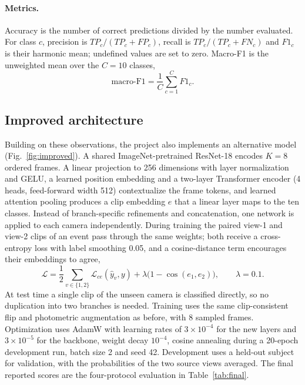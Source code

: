 \documentclass[runningheads]{llncs}
\begin{document}
\paragraph{Metrics.} Accuracy is the number of correct predictions divided by the number evaluated. For class $c$, precision is $TP_c/(TP_c+FP_c)$, recall is $TP_c/(TP_c+FN_c)$ and $F1_c$ is their harmonic mean; undefined values are set to zero. Macro-F1 is the unweighted mean over the $C{=}10$ classes,
\begin{equation}
\text{macro-F1}=\frac1C\sum_{c=1}^{C}F1_c .
\end{equation}

\subsection{Improved architecture}\label{sec:improved}
Building on these observations, the project also implements an alternative model (Fig.~\ref{fig:improved}). A shared ImageNet-pretrained ResNet-18 encodes $K{=}8$ ordered frames. A linear projection to 256 dimensions with layer normalization and GELU, a learned position embedding and a two-layer Transformer encoder (4 heads, feed-forward width 512) contextualize the frame tokens, and learned attention pooling produces a clip embedding $e$ that a linear layer maps to the ten classes. Instead of branch-specific refinements and concatenation, one network is applied to each camera independently. During training the paired view-1 and view-2 clips of an event pass through the same weights; both receive a cross-entropy loss with label smoothing 0.05, and a cosine-distance term encourages their embeddings to agree,
\begin{equation}
\mathcal L=\frac12\sum_{v\in\{1,2\}}\mathcal L_{ce}(\hat y_v,y)+\lambda\bigl(1-\cos(e_1,e_2)\bigr),\qquad\lambda=0.1 .
\end{equation}
At test time a single clip of the unseen camera is classified directly, so no duplication into two branches is needed. Training uses the same clip-consistent flip and photometric augmentation as before, with 8 sampled frames. Optimization uses AdamW with learning rates of $3\times10^{-4}$ for the new layers and $3\times10^{-5}$ for the backbone, weight decay $10^{-4}$, cosine annealing during a 20-epoch development run, batch size 2 and seed 42. Development uses a held-out subject for validation, with the probabilities of the two source views averaged. The final reported scores are the four-protocol evaluation in Table~\ref{tab:final}.
\end{document}

